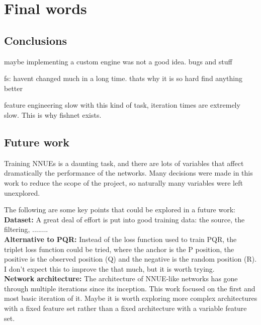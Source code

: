 \section{Final words}
\subsection{Conclusions}

maybe implementing a custom engine was not a good idea. bugs and stuff

fs: havent changed much in a long time. thats why it is so hard find anything better

feature engineering slow with this kind of task, iteration times are extremely slow. This is why fishnet exists.



\subsection{Future work}

Training NNUEs is a daunting task, and there are lots of variables that affect dramatically the performance of the networks. Many decisions were made in this work to reduce the scope of the project, so naturally many variables were left unexplored.

The following are some key points that could be explored in a future work: \\

\textbf{Dataset:}
A great deal of effort is put into good training data: the source, the filtering, ........ 
\\

\textbf{Alternative to PQR:} Instead of the loss function used to train PQR, the triplet loss function could be tried, where the anchor is the P position, the positive is the observed position (Q) and the negative is the random position (R). I don't expect this to improve the that much, but it is worth trying. \\

\textbf{Network architecture:} The architecture of NNUE-like networks has gone through multiple iterations since its inception. This work focused on the first and most basic iteration of it. Maybe it is worth exploring more complex architectures with a fixed feature set rather than a fixed architecture with a variable feature set.

